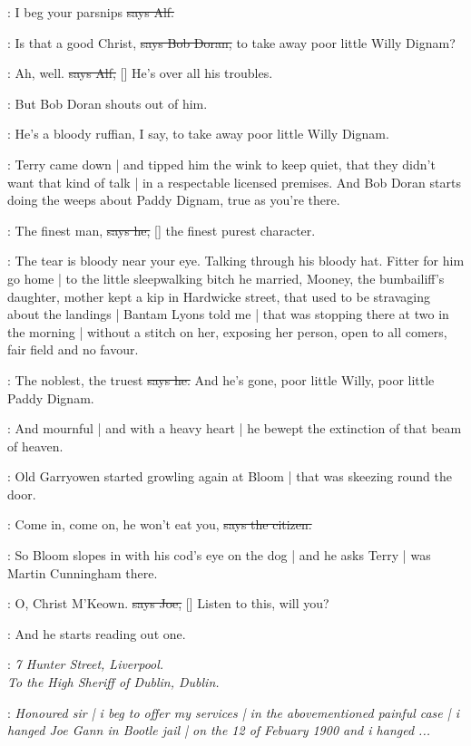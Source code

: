 \bergan:
I beg your parsnips
\sout{says Alf.}

\doran:
Is that a good Christ,
\sout{says Bob Doran,}
to take away poor little Willy Dignam?

\bergan:
Ah,
well.
\sout{says Alf,}
[]
He's over all his troubles.

\Nq:
But Bob Doran shouts out of him.

\doran:
He's a bloody ruffian,
I say,
to take away poor little Willy Dignam.

\Nq:
Terry came down |
and tipped him the wink to keep quiet,
that they didn't want that kind of talk |
in a respectable licensed premises.
And Bob Doran starts doing the weeps about Paddy Dignam,
true as you're there.

\doran:
The finest man,
\sout{says he,}
[]
the finest purest character.

\Nq:
The tear is bloody near your eye.
Talking through his bloody hat.
Fitter for him go home |
to the little sleepwalking bitch he married,
Mooney,
the bumbailiff's daughter,
mother kept a kip in Hardwicke street,
that used to be stravaging about the landings |
Bantam Lyons told me |
that was stopping there at two in the morning |
without a stitch on her,
exposing her person,
open to all comers,
fair field and no favour.

\doran:
The noblest,
the truest
\sout{says he.}
And he's gone,
poor little Willy,
poor little Paddy Dignam.

:
And mournful |
and with a heavy heart |
he bewept the extinction of that beam of heaven.

\Nq:
Old Garryowen started growling again at Bloom |
that was skeezing round the door.

\citizen:
Come in,
come on,
he won't eat you,
\sout{says the citizen.}

\Nq:
So Bloom slopes in with his cod's eye on the dog |
and he asks Terry |
was Martin Cunningham there.

\joe:
O,
Christ M'Keown.
\sout{says Joe,}
[]
Listen to this,
will you?

\Nq:
And he starts reading out one.


\joe:
\emph{7 Hunter Street,
Liverpool.\\
To the High Sheriff of Dublin,
Dublin.}

\joe:
\emph{Honoured sir |
i beg to offer my services |
in the abovementioned painful case |
i hanged Joe Gann in Bootle jail |
on the 12 of Febuary 1900
and i hanged ...}

